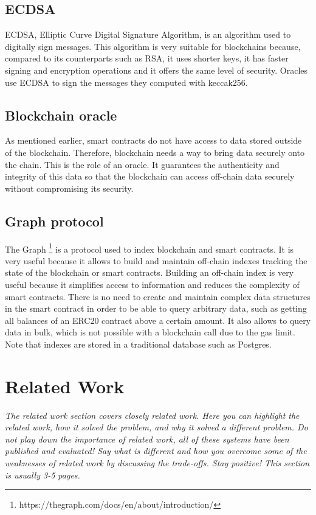 \documentclass[a4paper,11pt,oneside]{report}
\begin{document}
\section{ECDSA}
ECDSA, Elliptic Curve Digital Signature Algorithm, is an algorithm used to digitally sign messages. This algorithm is very suitable for blockchains because, compared to its counterparts such as RSA, it uses shorter keys, it has faster signing and encryption operations and it offers the same level of security. Oracles use ECDSA to sign the messages they computed with keccak256.

\section{Blockchain oracle}
As mentioned earlier, smart contracts do not have access to data stored outside of the blockchain. Therefore, blockchain needs a way to bring data securely onto the chain. This is the role of an oracle. It guarantees the authenticity and integrity of this data so that the blockchain can access off-chain data securely without compromising its security.

\section{Graph protocol}
The Graph \footnote{https://thegraph.com/docs/en/about/introduction/} is a protocol used to index blockchain and smart contracts. It is very useful because it allows to build and maintain off-chain indexes tracking the state of the blockchain or smart contracts. Building an off-chain index is very useful because it simplifies access to information and reduces the complexity of smart contracts. There is no need to create and maintain complex data structures in the smart contract in order to be able to query arbitrary data, such as getting all balances of an ERC20 contract above a certain amount. It also allows to query data in bulk, which is not possible with a blockchain call due to the gas limit. Note that indexes are stored in a traditional database such as Postgres.

\chapter{Related Work}

\textit{The related work section covers closely related work. Here you can highlight
the related work, how it solved the problem, and why it solved a different
problem. Do not play down the importance of related work, all of these
systems have been published and evaluated! Say what is different and how
you overcome some of the weaknesses of related work by discussing the 
trade-offs. Stay positive!
This section is usually 3-5 pages.} \\
\end{document}
